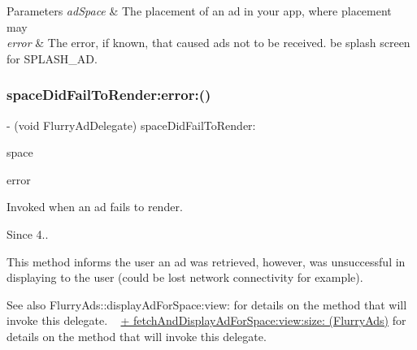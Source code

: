 \begin{DoxyParams}{Parameters}
{\em ad\+Space} & The placement of an ad in your app, where placement may \\
\hline
{\em error} & The error, if known, that caused ads not to be received. be splash screen for S\+P\+L\+A\+S\+H\+\_\+\+AD. \\
\hline
\end{DoxyParams}
\mbox{\label{protocolFlurryAdDelegate_01-p_af988369f8b2606cebfca16672aabb280}} 
\subsubsection{\texorpdfstring{space\+Did\+Fail\+To\+Render\+:error\+:()}{spaceDidFailToRender:error:()}}
{\footnotesize\ttfamily -\/ (void Flurry\+Ad\+Delegate) space\+Did\+Fail\+To\+Render\+: \begin{DoxyParamCaption}\item[{(N\+S\+String $\ast$)}]{space }\item[{error:(N\+S\+Error $\ast$)}]{error }\end{DoxyParamCaption}\hspace{0.3cm}{\ttfamily [optional]}}



Invoked when an ad fails to render. 

\begin{DoxySince}{Since}
4..
\end{DoxySince}
This method informs the user an ad was retrieved, however, was unsuccessful in displaying to the user (could be lost network connectivity for example).

\begin{DoxySeeAlso}{See also}
Flurry\+Ads\+::display\+Ad\+For\+Space\+:view\+: for details on the method that will invoke this delegate. ~\newline
\hyperlink{interfaceFlurryAds_a6015497d507dc4c08a3b03b3717711ea}{+ fetch\+And\+Display\+Ad\+For\+Space\+:view\+:size\+: (\+Flurry\+Ads)} for details on the method that will invoke this delegate.
\end{DoxySeeAlso}

